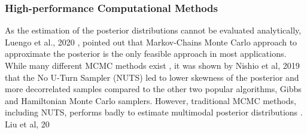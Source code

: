 \documentclass[11pt]{article}
\begin{document}
\subsubsection{High-performance Computational Methods}
As the estimation of the posterior distributions cannot be evaluated analytically, Luengo et al., 2020 \cite{MCMethods}, pointed out that Markov-Chains Monte Carlo approach to approximate the posterior is the only feasible approach in most applications. While many different MCMC methods exist \cite{ReviewMCMCAlgo}, it was shown by Nishio et al, 2019 \cite{NUTSvsHMCvsGibbs} that the No U-Turn Sampler (NUTS) led to lower skewness of the posterior and more decorrelated samples compared to the other two popular algorithms, Gibbs and Hamiltonian Monte Carlo samplers. However, traditional MCMC methods, including NUTS, performs badly to estimate multimodal posterior distributions \cite{mcmcTrapped}. Liu et al, 20 
\end{document}
